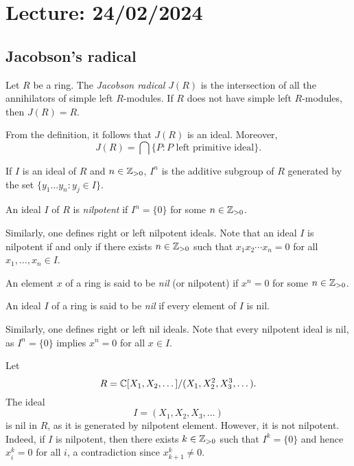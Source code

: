 \section{Lecture: 24/02/2024}
\label{04}


\subsection{Jacobson's radical}

\begin{definition}
Let $R$ be a ring. The \emph{Jacobson radical} $J(R)$
is the intersection of all the annihilators of simple left $R$-modules. If $R$ does not
have simple left $R$-modules, then $J(R)=R$. 
\end{definition}

From the definition, it follows
that $J(R)$ is an ideal. Moreover, 
	\[
		J(R)=\bigcap\{P:\text{$P$ left primitive ideal}\}.
	\]

	If $I$ is an ideal of $R$ and $n\in\mathbb{Z}_{>0}$, $I^n$ is the additive subgroup of $R$ 
generated by the set $\{y_1\dots y_n:y_j\in I\}$. 

\begin{definition}
An ideal $I$ of $R$ is \emph{nilpotent} 
if $I^n=\{0\}$ for some $n\in\mathbb{Z}_{>0}$.
\end{definition}

Similarly, one defines right or left nilpotent ideals. 
Note that an ideal $I$ is nilpotent if and only if there exists $n\in\mathbb{Z}_{>0}$ such that 
$x_1x_2\cdots x_n=0$ for all $x_1,\dots,x_n\in I$.  

\begin{definition}
	An element $x$ of a ring is said to be \emph{nil} (or nilpotent) if $x^n=0$ for some $n\in\mathbb{Z}_{>0}$. 
\end{definition}

\begin{definition}
An ideal $I$ of a ring is said to be \emph{nil} if every element of $I$ is nil. 
\end{definition}

Similarly, one defines right or left nil ideals. 
Note that every nilpotent ideal is nil, as $I^n=\{0\}$ implies $x^n=0$ for all 
$x\in I$.

\begin{example}
	Let \[
 R=\mathbb{C}[X_1,X_2,\dots]/(X_1,X_2^2,X_3^3,\dots).
    \]
    The ideal 
	\[ 
    I=(X_1,X_2,X_3,\dots)
    \]
    is nil in $R$, as it is generated by nilpotent element. However, it is not nilpotent. Indeed, if $I$ is nilpotent, then there exists $k\in\mathbb{Z}_{>0}$ such that 
	$I^k=\{0\}$ and hence $x_i^k=0$ for all $i$, a contradiction since 
	$x_{k+1}^k\ne0$. 	
\end{example}

